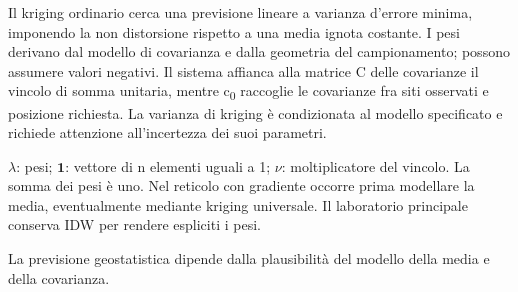\documentclass[12pt,aspectratio=1610]{beamer}
\begin{document}
\begin{lrbox}{\BodyBox}\begin{minipage}[t]{10.25cm}\raggedright\sloppy\color{Ink}\fontsize{12.4}{16.4}\selectfont Il kriging ordinario cerca una previsione lineare a varianza d’errore minima, imponendo la non distorsione rispetto a una media ignota costante. I pesi derivano dal modello di covarianza e dalla geometria del campionamento; possono assumere valori negativi. Il sistema affianca alla matrice C delle covarianze il vincolo di somma unitaria, mentre c\textsubscript{0} raccoglie le covarianze fra siti osservati e posizione richiesta. La varianza di kriging è condizionata al modello specificato e richiede attenzione all’incertezza dei suoi parametri.\par{}\end{minipage}\end{lrbox}
\begin{lrbox}{\SideBox}\begin{minipage}[t]{7.45cm}\raggedright\sloppy\color{Ink}\fontsize{12.2}{16.1}\selectfont $\lambda$: pesi; $\mathbf1$: vettore di n elementi uguali a 1; $\nu$: moltiplicatore del vincolo. La somma dei pesi è uno. Nel reticolo con gradiente occorre prima modellare la media, eventualmente mediante kriging universale. Il laboratorio principale conserva IDW per rendere espliciti i pesi.\end{minipage}\end{lrbox}
\begin{lrbox}{\RecallBox}\begin{minipage}[t]{16.45cm}\raggedright\sloppy\color{Ink}\fontsize{10.1}{13.2}\selectfont La previsione geostatistica dipende dalla plausibilità del modello della media e della covarianza.\end{minipage}\end{lrbox}
\end{document}
